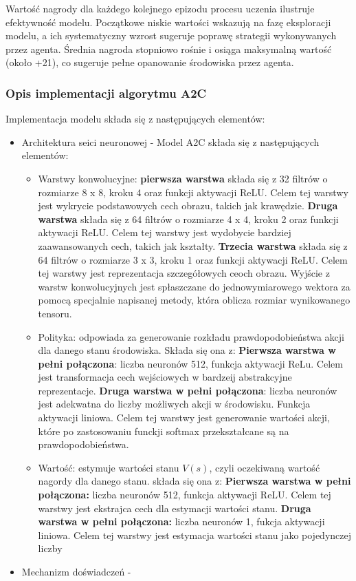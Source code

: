 \documentclass[a4paper, 12pt]{article}
\begin{document}
    Wartość nagrody dla każdego kolejnego epizodu procesu uczenia ilustruje efektywność modelu.
    Początkowe niskie wartości wskazują na fazę eksploracji modelu, a ich systematyczny wzrost sugeruje poprawę strategii wykonywanych przez agenta.
    Średnia nagroda stopniowo rośnie i osiąga maksymalną wartość (około +21), co sugeruje pełne opanowanie środowiska przez agenta.
    \subsubsection{Opis implementacji algorytmu A2C}
    Implementacja modelu składa się z następujących elementów:
    \begin{itemize}
        \item Architektura seici neuronowej - Model A2C składa się z następujących elementów:
        \begin{itemize}
            \item Warstwy konwolucyjne: \textbf{pierwsza warstwa} składa się z 32 filtrów o rozmiarze 8 x 8, kroku 4 oraz funkcji aktywacji ReLU.
            Celem tej warstwy jest wykrycie podstawowych cech obrazu, takich jak krawędzie. 
            \textbf{Druga warstwa} składa się z 64 filtrów o rozmiarze 4 x 4, kroku 2 oraz funkcji aktywacji ReLU.
            Celem tej warstwy jest wydobycie bardziej zaawansowanych cech, takich jak kształty.
            \textbf{Trzecia warstwa} składa się z 64 filtrów o rozmiarze 3 x 3, kroku 1 oraz funkcji aktywacji ReLU.
            Celem tej warstwy jest reprezentacja szczegółowych ceoch obrazu.
            Wyjście z warstw konwolucyjnych jest spłaszczane do jednowymiarowego wektora za pomocą specjalnie napisanej metody,
            która oblicza rozmiar wynikowanego tensoru.
            \item Polityka: odpowiada za generowanie rozkładu prawdopodobieństwa akcji dla danego stanu środowiska. Składa się ona z:
            \textbf{Pierwsza warstwa w pełni połączona}: liczba neuronów 512, funkcja aktywacji ReLu. Celem jest transformacja cech wejściowych
            w bardzeij abstrakcyjne reprezentacje.
            \textbf{Druga warstwa w pełni połączona}: liczba neuronów jest adekwatna do liczby możliwych akcji w środowisku. 
            Funkcja aktywacji liniowa. Celem tej warstwy jest generowanie wartości akcji, które po zastosowaniu funckji softmax przekształcane są na prawdopodobieństwa.
            \item Wartość: estymuje wartości stanu \( V(s) \), czyli oczekiwaną wartość nagordy dla danego stanu. składa się ona z:
            \textbf{Pierwsza warstwa w pełni połączona:} liczba neuronów 512, funkcja aktywacji ReLU. 
            Celem tej warstwy jest ekstrajca cech dla estymacji wartości stanu.
            \textbf{Druga warstwa w pełni połączona:} liczba neuronów 1, fukcja aktywacji liniowa. 
            Celem tej warstwy jest estymacja wartości stanu jako pojedynczej liczby
        \end{itemize}
        \item Mechanizm doświadczeń - 
    \end{itemize}
\end{document}
